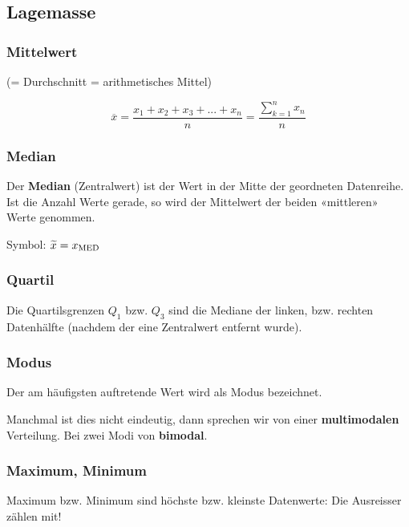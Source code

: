 \hrulefill
\begin{multicols}{2}

\subsection*{Lagemasse}
\subsubsection*{Mittelwert}
(= Durchschnitt = arithmetisches Mittel)


$$\overline{x} = \frac{x_1 + x_2 + x_3 + ... + x_n}{n}=  \frac{\sum\limits_{k=1}^nx_n}n$$


\subsubsection*{Median}


Der \textbf{Median} (Zentralwert) ist der Wert in der Mitte der geordneten Datenreihe. Ist
die Anzahl Werte gerade, so wird der Mittelwert der beiden
«mittleren» Werte genommen.

Symbol: $\widetilde{x} = x_{\textrm{MED}}$


\subsubsection*{Quartil}

Die Quartilsgrenzen $Q_1$ bzw. $Q_3$ sind die Mediane der linken,
bzw. rechten Datenhälfte (nachdem der eine Zentralwert entfernt
wurde).

\subsubsection*{Modus}
Der am häufigsten auftretende Wert wird als Modus bezeichnet.

Manchmal ist dies nicht eindeutig, dann sprechen wir von einer
\textbf{multimodalen} Verteilung. Bei zwei Modi von \textbf{bimodal}.

\subsubsection*{Maximum, Minimum}

Maximum bzw. Minimum sind höchste bzw. kleinste Datenwerte: Die Ausreisser
zählen mit!

%
\TRAINER{}%
%
\forceCB%


\end{multicols}
